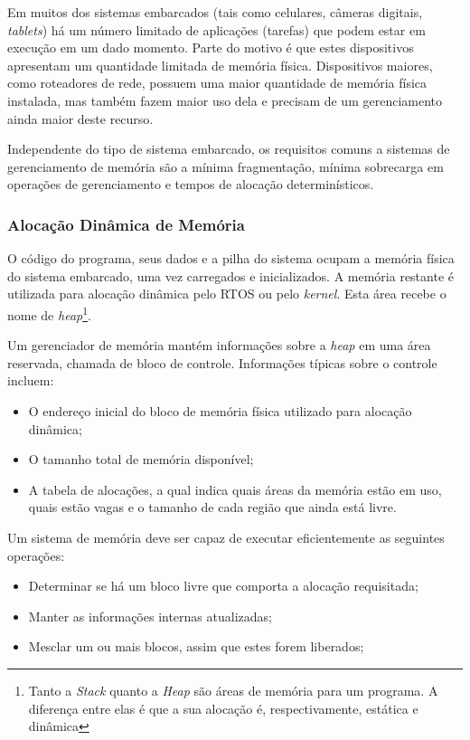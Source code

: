 Em muitos dos sistemas embarcados (tais como celulares, câmeras digitais, \emph{tablets}) há um número limitado de aplicações (tarefas) que  podem estar em execução em um dado momento. Parte do motivo é que estes dispositivos apresentam um quantidade limitada de memória física. Dispositivos maiores, como roteadores de rede, possuem uma maior quantidade de memória física instalada, mas também fazem maior uso dela e precisam de um gerenciamento ainda maior deste recurso.

Independente do tipo de sistema embarcado, os requisitos comuns a sistemas de gerenciamento de memória são a mínima fragmentação, mínima sobrecarga em operações de gerenciamento e tempos de alocação determinísticos.

\subsubsection{Alocação Dinâmica de Memória}

O código do programa, seus dados e a pilha do sistema ocupam a memória física do sistema embarcado, uma vez carregados e inicializados. A memória restante é utilizada para alocação dinâmica pelo RTOS ou pelo \emph{kernel}. Esta área recebe o nome de \emph{heap}\footnote{Tanto a \emph{Stack} quanto a \emph{Heap} são áreas de memória para um programa. A diferença entre elas é que a sua alocação é, respectivamente, estática e dinâmica}.

Um gerenciador de memória mantém informações sobre a \emph{heap} em uma área reservada, chamada de bloco de controle. Informações típicas sobre o controle incluem:

\begin{itemize}
	\item O endereço inicial do bloco de memória física utilizado para alocação dinâmica;
	\item O tamanho total de memória disponível;
	\item A tabela de alocações, a qual indica quais áreas da memória estão em uso, quais estão vagas e o tamanho de cada região que ainda está livre.
\end{itemize}

Um sistema de memória deve ser capaz de executar eficientemente as seguintes operações:

\begin{itemize}
	\item Determinar se há um bloco livre que comporta a alocação requisitada;
	\item Manter as informações internas atualizadas;
	\item Mesclar um ou mais blocos, assim que estes forem liberados;
\end{itemize}

